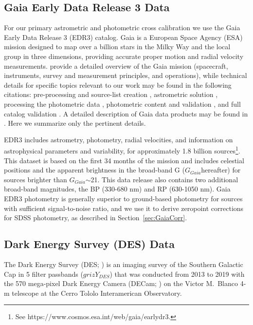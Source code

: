 \documentclass[fleqn,usenatbib]{mnras}
\newcommand{\GG}{\hbox{$G_{Gaia}$}}
\begin{document}
\subsection{Gaia Early Data Release 3 Data} \label{ssec:gaia}
 
For our primary astrometric and photometric cross calibration we use the Gaia Early Data Release 3 (EDR3) catalog.  Gaia is a European Space Agency (ESA) mission designed to map over a billion stars in the Milky Way and the local group in three dimensions, providing accurate proper motion and radial velocity measurements. \citet{GaiaCollab2016} provide a detailed overview of the Gaia mission (spacecraft, instruments, survey and measurement principles, and operations), while technical details for specific topics relevant to our work may be found in the following citations: pre-processing and source-list creation \citep{Fabr2016}, astrometric solution \citep{LInd2018}, processing the photometric data \citep{Riel2018}, photometric content and validation \citep{Evan2018}, and full catalog validation \citep{Aren2018}. A detailed description of Gaia data products  
may be found in \citet{GaiaCollab2018b}. Here we summarize only the pertinent details.

EDR3 includes astrometry, photometry, radial velocities, and information on astrophysical parameters and variability, for approximately 1.8 billion sources\footnote{See https://www.cosmos.esa.int/web/gaia/earlydr3.}. This dataset is based on the first 34 months of the mission and includes celestial positions and the apparent brightness in the broad-band G (\GG hereafter) for sources brighter than \GG$\sim$21.  This data release also contains two additional broad-band magnitudes, the BP (330-680 nm) and RP (630-1050 nm). Gaia EDR3 photometry is generally superior to ground-based photometry for sources with sufficient signal-to-noise ratio, and we use it to derive zeropoint corrections for SDSS photometry, as described in Section~\ref{sec:GaiaCorr}. 
 

\subsection{Dark Energy Survey (DES) Data} \label{ssec:des}


The Dark Energy Survey (DES; \citealt{2016MNRAS.460.1270D}) is an imaging survey of the Southern Galactic Cap in 5 filter passbands ($grizY_{DES}$) that was conducted from 2013 to 2019 with the 570 mega-pixel Dark Energy Camera (DECam;
\citealt{2008arXiv0810.3600H,2015AJ....150..150F}) on the Victor M.\ Blanco 4-m telescope at the Cerro Tololo Interamerican
Observatory.
\end{document}
